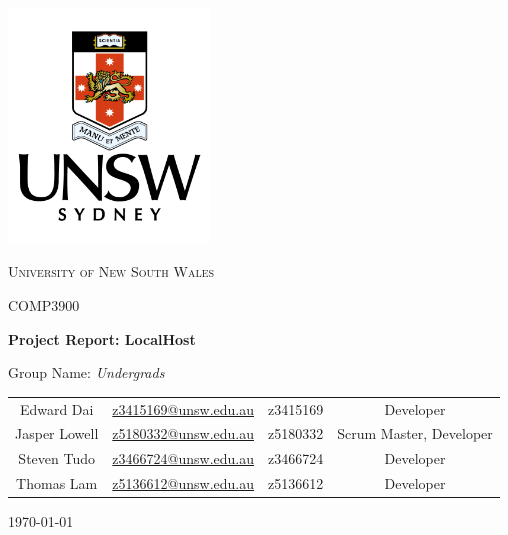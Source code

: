 \documentclass[a4paper,12pt]{article}
\begin{document}
\begin{titlepage}
  \centering \includegraphics[width=0.4\textwidth]{../unsw.png}\par\vspace{1cm}
  {\scshape\LARGE University of New South Wales \par}
  \vspace{0.5cm}
  {\scshape\Large COMP3900 \par}
  \vspace{0.5cm}
  {\huge\bfseries Project Report: LocalHost \par}
  \vspace{1cm}
  {\Large{} Group Name:\itshape{} Undergrads \par}
  \vspace{2cm}
  \begin{center}
    \begin{tabular}{c c c c}
      Edward Dai & \href{mailto:z3415169@unsw.edu.au}{z3415169@unsw.edu.au} &
      z3415169 & Developer \\
      Jasper Lowell & \href{mailto:z5180332@unsw.edu.au}{z5180332@unsw.edu.au} &
      z5180332 & Scrum Master, Developer \\
      Steven Tudo & \href{mailto:z3466724@unsw.edu.au}{z3466724@unsw.edu.au} &
      z3466724 & Developer \\
      Thomas Lam & \href{mailto:z5136612@unsw.edu.au}{z5136612@unsw.edu.au} &
      z5136612 & Developer
    \end{tabular}
  \end{center}
  \vfill
  {\large \today\par}
\end{titlepage}

\newpage
\tableofcontents
\newpage



\printbibliography[heading=bibintoc]
\end{document}
